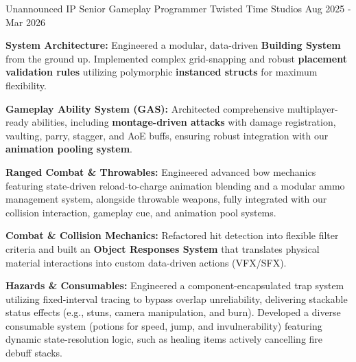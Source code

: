 
\begin{cventries}

  \cventry
    {Unannounced IP} %
    {Senior Gameplay Programmer} %
    {Twisted Time Studios} %
    {Aug 2025 - Mar 2026} %
    {
      \begin{cvitems} %
        \item {\textbf{System Architecture:} Engineered a modular, data-driven \textbf{Building System} from the ground up. Implemented complex grid-snapping and robust \textbf{placement validation rules} utilizing polymorphic \textbf{instanced structs} for maximum flexibility.}
        \item {\textbf{Gameplay Ability System (GAS):} Architected comprehensive multiplayer-ready abilities, including \textbf{montage-driven attacks} with damage registration, vaulting, parry, stagger, and AoE buffs, ensuring robust integration with our \textbf{animation pooling system}.}
        \item {\textbf{Ranged Combat \& Throwables:} Engineered advanced bow mechanics featuring state-driven reload-to-charge animation blending and a modular ammo management system, alongside throwable weapons, fully integrated with our collision interaction, gameplay cue, and animation pool systems.}
        \item {\textbf{Combat \& Collision Mechanics:} Refactored hit detection into flexible filter criteria and built an \textbf{Object Responses System} that translates physical material interactions into custom data-driven actions (VFX/SFX).}
        \item {\textbf{Hazards \& Consumables:} Engineered a component-encapsulated trap system utilizing fixed-interval tracing to bypass overlap unreliability, delivering stackable status effects (e.g., stuns, camera manipulation, and burn). Developed a diverse consumable system (potions for speed, jump, and invulnerability) featuring dynamic state-resolution logic, such as healing items actively cancelling fire debuff stacks.}

\end{cvitems}}
\end{cventries}
